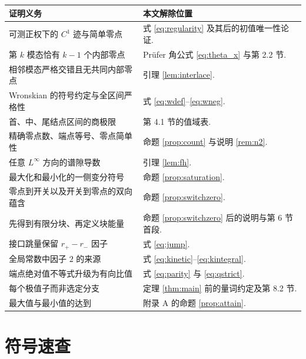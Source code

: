 \documentclass[UTF8]{ctexart}
\begin{document}
\begin{center}
\begin{tabular}{ll}
\toprule
证明义务 & 本文解除位置\\
\midrule
可测正权下的 $C^1$ 迹与简单零点 &
式 \eqref{eq:regularity} 及其后的初值唯一性论证.\\
第 $k$ 模态恰有 $k-1$ 个内部零点 &
Pr\"ufer 角公式 \eqref{eq:theta_x} 与第 2.2 节.\\
相邻模态严格交错且无共同内部零点 &
引理 \ref{lem:interlace}.\\
Wronskian 的符号约定与全区间严格性 &
式 \eqref{eq:wdef}--\eqref{eq:wneg}.\\
首、中、尾结点区间的商极限 &
第 4.1 节的值域表.\\
精确零点数、端点等号、零点简单性 &
命题 \ref{prop:count} 与说明 \ref{rem:n2}.\\
任意 $L^\infty$ 方向的谱隙导数 &
引理 \ref{lem:fh}.\\
最大化和最小化的一侧变分符号 &
命题 \ref{prop:saturation}.\\
零点到开关以及开关到零点的双向蕴含 &
命题 \ref{prop:switchzero}.\\
先得到有限分块、再定义块能量 &
命题 \ref{prop:switchzero} 后的说明与第 6 节首段.\\
接口跳量保留 $r_+-r_-$ 因子 &
式 \eqref{eq:jump}.\\
全局常数中因子 $2$ 的来源 &
式 \eqref{eq:kinetic}--\eqref{eq:kintegral}.\\
端点绝对值不等式升级为有向比值 &
式 \eqref{eq:parity} 与 \eqref{eq:qstrict}.\\
每个极值子而非选定分支 &
定理 \ref{thm:main} 前的量词约定及第 8.2 节.\\
最大值与最小值的达到 &
附录 A 的命题 \ref{prop:attain}.\\
\bottomrule
\end{tabular}
\end{center}

\section{符号速查}
\end{document}
